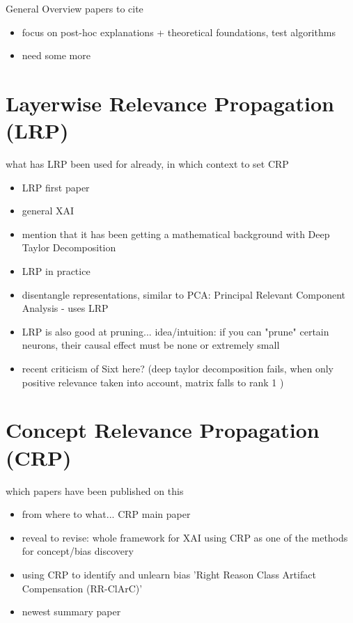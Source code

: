 General Overview papers to cite
\begin{itemize}
      \item focus on post-hoc explanations + theoretical foundations, test algorithms \cite{Samek2021}
      \item need some more 
\end{itemize}

\section{Layerwise Relevance Propagation (LRP)}
 {\color{red} what has LRP been used for already, in which context to set CRP}

\begin{itemize}
      \item LRP first paper \cite{Bach2015}
      \item general XAI \cite{Samek2021}
      \item mention that it has been getting a mathematical background with Deep Taylor Decomposition  \cite{Montavon2017}
      \item LRP in practice \cite{Kohlbrenner2020}
      \item disentangle representations, similar to PCA: Principal Relevant Component Analysis - uses LRP \cite{Chormai2022}
      \item LRP is also good at pruning... idea/intuition: if you can "prune" certain neurons, their causal effect must be none or extremely small \cite{Yeom2019}
      \item recent criticism of Sixt here? (deep taylor decomposition fails, when only positive relevance taken into account, matrix falls to rank 1 \cite{Sixt2022})
\end{itemize}

\section{Concept Relevance Propagation (CRP)}
which papers have been published on this
\begin{itemize}
      \item from where to what... CRP main paper \cite{Achtibat2022}
      \item reveal to revise: whole framework for XAI using CRP as one of the methods for concept/bias discovery \cite{Pahde2023}
      \item using CRP to identify and unlearn bias 'Right Reason Class Artifact Compensation (RR-ClArC)' \cite{Dreyer2023a}
      \item newest summary paper \cite{Achtibat2023}
\end{itemize}

